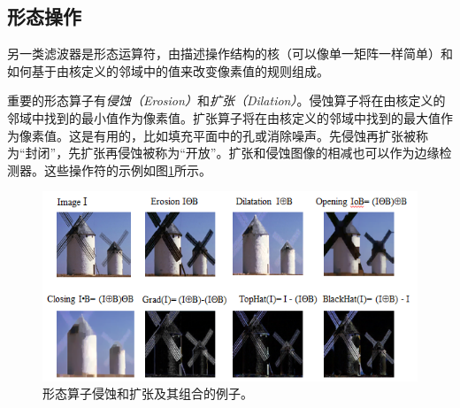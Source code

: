 \subsection{形态操作}
另一类滤波器是形态运算符，由描述操作结构的核（可以像单一矩阵一样简单）和如何基于由核定义的邻域中的值来改变像素值的规则组成。


重要的形态算子有\emph{侵蚀（Erosion）}和\emph{扩张（Dilation）}。侵蚀算子将在由核定义的邻域中找到的最小值作为像素值。扩张算子将在由核定义的邻域中找到的最大值作为像素值。这是有用的，比如填充平面中的孔或消除噪声。先侵蚀再扩张被称为“封闭”，先扩张再侵蚀被称为“开放”。扩张和侵蚀图像的相减也可以作为边缘检测器。这些操作符的示例如图\ref{fig:morphology}所示。


\begin{figure}
	\centering
		\includegraphics[width=\textwidth]{figs/morphology}
	\caption{形态算子侵蚀和扩张及其组合的例子。
	\label{fig:morphology}}
\end{figure}



